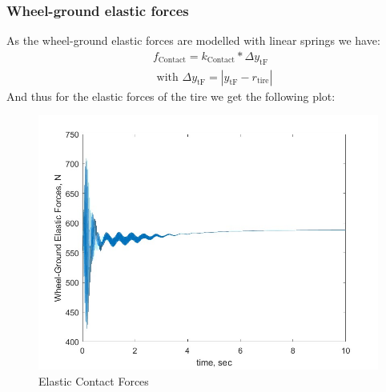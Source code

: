 \subsubsection{Wheel-ground elastic forces}
As the wheel-ground elastic forces are modelled with linear springs we have:
\begin{equation}
    \begin{split}
        &f_\text{Contact} = k_\text{Contact} * \Delta y_\text{tF}\\
        & \text{ with } \Delta y_\text{tF} = |y_\text{tF}-r_\text{tire}|
    \end{split}
\end{equation}
And thus for the elastic forces of the tire we get the following plot:
\begin{figure}[ht]
    \centering
    \includegraphics[scale=0.4]{images/wheel-ground_elastic_forces.jpg}
    \caption{Elastic Contact Forces}
    \label{fig:contact_forces}
\end{figure}

\clearpage %
